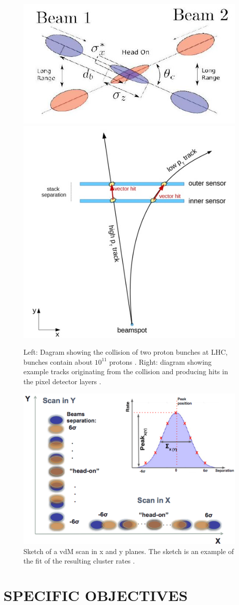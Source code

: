 \documentclass[final,12p]{article}
\begin{document}
\begin{figure}[H]
  \centering
  \includegraphics[width=0.48\columnwidth]{./bunchcrossing.jpg}
  \includegraphics[width=0.42\columnwidth]{./vectorhit1.jpg}
  \caption{
    Left: Dagram showing the collision of two proton bunches at LHC, bunches contain about $10^{11}$ protons  \cite{deMaria:2008zzb}.
    Right: diagram showing example tracks originating from the collision and producing hits in the pixel detector layers \cite{Thomsom}.
  }
  \label{fig:bunchcrossing}
\end{figure}


\begin{figure}[H]
  \centering
  \includegraphics[width=0.7\columnwidth]{./vdm_sketch.png}
  \caption{
   Sketch of a vdM scan in x and y planes. The sketch is an example of
the fit of the resulting cluster rates \cite{vdMSketch}.
  }
  \label{vdMSketch}
\end{figure}


\section{SPECIFIC OBJECTIVES}
\end{document}
